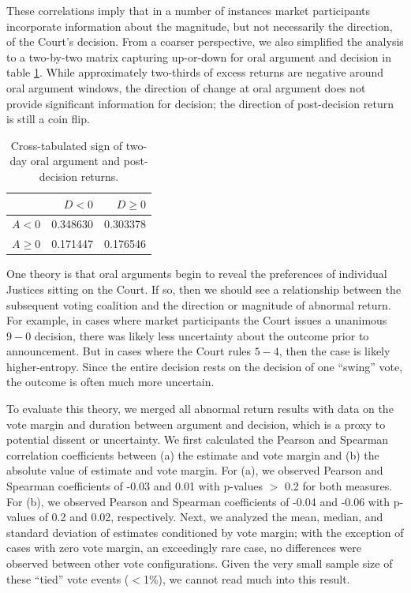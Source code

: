 \documentclass[preprint,12pt]{elsarticle}
\begin{document}
These correlations imply that in a number of instances market participants incorporate information about the magnitude, but not necessarily the direction, of the Court's decision.  From a coarser perspective, we also simplified the analysis to a two-by-two matrix capturing up-or-down for oral argument and decision in table \ref{oral_argument_crosstab}.  While approximately two-thirds of excess returns are negative around oral argument windows, the direction of change at oral argument does not provide significant information for decision; the direction of post-decision return is still a coin flip.

\begin{table}[h!]
\centering
\begin{tabular}{lrr}
\hline
	& $D < 0$ & $D \geq 0$\\
\hline
$A < 0$ &  0.348630 &  0.303378 \\
$A \geq 0$	&  0.171447 &  0.176546 \\
\hline
\end{tabular}
\caption{Cross-tabulated sign of two-day oral argument and post-decision returns.}
\label{oral_argument_crosstab}
\end{table}

One theory is that oral arguments begin to reveal the preferences of individual Justices sitting on the Court.  If so, then we should see a relationship between the subsequent voting coalition and the direction or magnitude of abnormal return.  For example, in cases where market participants the Court issues a unanimous $9-0$ decision, there was likely less uncertainty about the outcome prior to announcement.  But in cases where the Court rules $5-4$, then the case is likely higher-entropy.  Since the entire decision rests on the decision of one ``swing'' vote, the outcome is often much more uncertain.

To evaluate this theory, we merged all abnormal return results with data on the vote margin and duration between argument and decision, which is a proxy to potential dissent or uncertainty.  We first calculated the Pearson and Spearman correlation coefficients between (a) the estimate and vote margin and (b) the absolute value of estimate and vote margin.  For (a), we observed Pearson and Spearman coefficients of -0.03 and 0.01 with p-values $>$ 0.2 for both measures.  For (b), we observed Pearson and Spearman coefficients of -0.04 and -0.06 with p-values of 0.2 and 0.02, respectively.   Next, we analyzed the mean, median, and standard deviation of estimates conditioned by vote margin; with the exception of cases with zero vote margin, an exceedingly rare case, no differences were observed between other vote configurations.  Given the very small sample size of these ``tied'' vote events ($<$1\%), we cannot read much into this result. 
\end{document}
